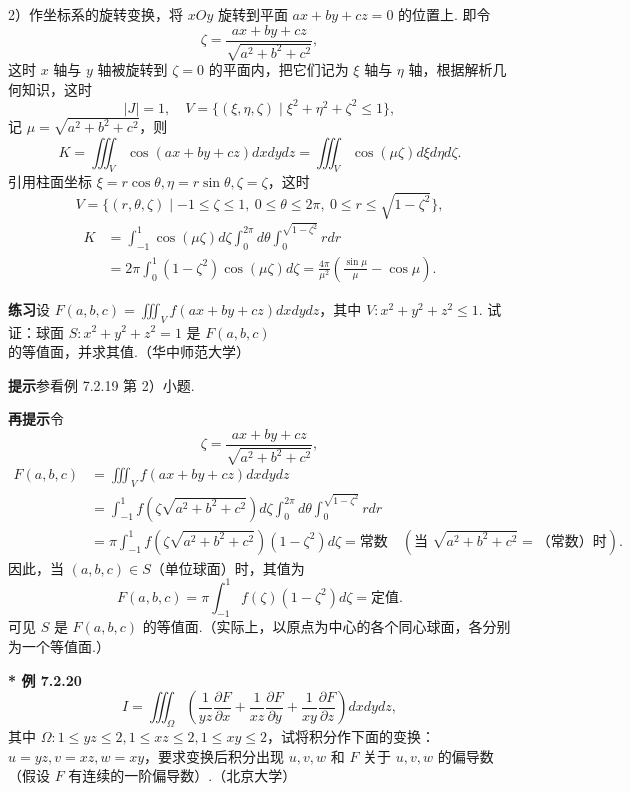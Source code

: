 \documentclass[UTF8, 12pt, fontset=fandol, oneside]{ctexart}
\begin{document}
2）作坐标系的旋转变换，将 $xOy$ 旋转到平面 $ax+by+cz=0$ 的位置上. 即令
\[
\zeta=\frac{ax+by+cz}{\sqrt{a^2+b^2+c^2}},
\]
这时 $x$ 轴与 $y$ 轴被旋转到 $\zeta=0$ 的平面内，把它们记为 $\xi$ 轴与 $\eta$ 轴，根据解析几何知识，这时
\[
|J|=1,\quad V=\{(\xi,\eta,\zeta)\mid \xi^2+\eta^2+\zeta^2\le1\},
\]
记 $\mu=\sqrt{a^2+b^2+c^2}$，则
\[
K=\iiint_V\cos(ax+by+cz)dxdydz
=\iiint_V\cos(\mu\zeta)d\xi d\eta d\zeta.
\]
引用柱面坐标 $\xi=r\cos\theta,\eta=r\sin\theta,\zeta=\zeta$，这时
\[
V=\{(r,\theta,\zeta)\mid -1\le\zeta\le1,\ 0\le\theta\le2\pi,\ 0\le r\le\sqrt{1-\zeta^2}\},
\]
\[
\begin{aligned}
K&=\int_{-1}^1\cos(\mu\zeta)d\zeta
\int_0^{2\pi}d\theta\int_0^{\sqrt{1-\zeta^2}}rdr\\
&=2\pi\int_0^1(1-\zeta^2)\cos(\mu\zeta)d\zeta
=\frac{4\pi}{\mu^2}\left(\frac{\sin\mu}{\mu}-\cos\mu\right).
\end{aligned}
\]

\noindent\textbf{练习}\quad 设 $F(a,b,c)=\iiint_V f(ax+by+cz)dxdydz$，其中 $V:x^2+y^2+z^2\le1$. 试证：球面 $S:x^2+y^2+z^2=1$ 是 $F(a,b,c)$ 的等值面，并求其值.（华中师范大学）

\noindent\textbf{提示}\quad 参看例 7.2.19 第 2）小题.

\noindent\textbf{再提示}\quad 令
\[
\zeta=\frac{ax+by+cz}{\sqrt{a^2+b^2+c^2}},
\]
\[
\begin{aligned}
F(a,b,c)&=\iiint_V f(ax+by+cz)dxdydz\\
&=\int_{-1}^1f\left(\zeta\sqrt{a^2+b^2+c^2}\right)d\zeta
\int_0^{2\pi}d\theta\int_0^{\sqrt{1-\zeta^2}}rdr\\
&=\pi\int_{-1}^1f\left(\zeta\sqrt{a^2+b^2+c^2}\right)(1-\zeta^2)d\zeta
=\text{常数}\quad\left(\text{当 }\sqrt{a^2+b^2+c^2}=\text{（常数）时}\right).
\end{aligned}
\]
因此，当 $(a,b,c)\in S$（单位球面）时，其值为
\[
F(a,b,c)=\pi\int_{-1}^1f(\zeta)(1-\zeta^2)d\zeta=\text{定值}.
\]
可见 $S$ 是 $F(a,b,c)$ 的等值面.（实际上，以原点为中心的各个同心球面，各分别为一个等值面.）

\noindent\textbf{* 例 7.2.20}\quad
\[
I=\iiint_\Omega\left(\frac1{yz}\frac{\partial F}{\partial x}
+\frac1{xz}\frac{\partial F}{\partial y}
+\frac1{xy}\frac{\partial F}{\partial z}\right)dxdydz,
\]
其中 $\Omega:1\le yz\le2,1\le xz\le2,1\le xy\le2$，试将积分作下面的变换：$u=yz,v=xz,w=xy$，要求变换后积分出现 $u,v,w$ 和 $F$ 关于 $u,v,w$ 的偏导数（假设 $F$ 有连续的一阶偏导数）.（北京大学）
\end{document}
